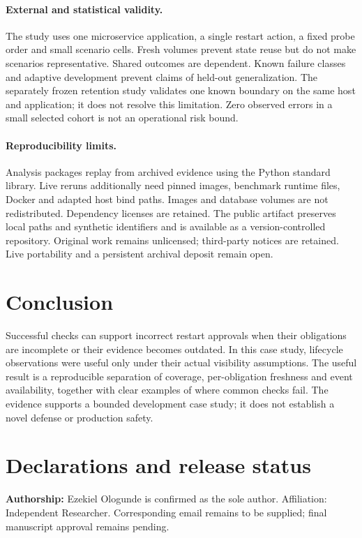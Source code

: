 \documentclass[manuscript,review,nonacm]{acmart}
\begin{document}
\paragraph{External and statistical validity.} The study uses one microservice application, a single restart action, a fixed probe order and small scenario cells. Fresh volumes prevent state reuse but do not make scenarios representative. Shared outcomes are dependent. Known failure classes and adaptive development prevent claims of held-out generalization. The separately frozen retention study validates one known boundary on the same host and application; it does not resolve this limitation. Zero observed errors in a small selected cohort is not an operational risk bound.

\paragraph{Reproducibility limits.} Analysis packages replay from archived evidence using the Python standard library. Live reruns additionally need pinned images, benchmark runtime files, Docker and adapted host bind paths. Images and database volumes are not redistributed. Dependency licenses are retained. The public artifact preserves local paths and synthetic identifiers and is available as a version-controlled repository. Original work remains unlicensed; third-party notices are retained. Live portability and a persistent archival deposit remain open.

\section{Conclusion}
Successful checks can support incorrect restart approvals when their obligations are incomplete or their evidence becomes outdated. In this case study, lifecycle observations were useful only under their actual visibility assumptions. The useful result is a reproducible separation of coverage, per-obligation freshness and event availability, together with clear examples of where common checks fail. The evidence supports a bounded development case study; it does not establish a novel defense or production safety.

\section*{Declarations and release status}
\textbf{Authorship:} Ezekiel Ologunde is confirmed as the sole author. Affiliation: Independent Researcher. Corresponding email remains to be supplied; final manuscript approval remains pending.
\end{document}

